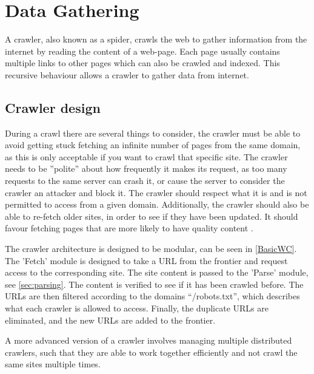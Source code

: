 \section{Data Gathering}\label{sec:DataGathering}
A crawler, also known as a spider, crawls the web to gather information from the
internet by reading the content of a web-page. Each page usually contains
multiple links to other pages which can also be crawled and indexed. This
recursive behaviour allows a crawler to gather data from internet.

\subsection{Crawler design}%
During a crawl there are several things to consider, the crawler must be able
to avoid getting stuck fetching an infinite number of pages from the same
domain, as this is only acceptable if you want to crawl that specific site. The
crawler needs to be ''polite'' about how frequently it makes its request, as
too many requests to the same server can crash it, or cause the server to
consider the crawler an attacker and block it. The crawler should respect what
it is and is not permitted to access from a given domain. Additionally, the
crawler should also be able to re-fetch older sites, in order to see if they
have been updated. It should favour fetching pages that are more likely to have
quality content \citep[Ch. 20.1]{manning2008introduction}.\nl

The crawler architecture is designed to be modular, can be seen in
\autoref{BasicWC}. The 'Fetch' module is designed to take a URL from the
frontier and request access to the corresponding site. The site content is
passed to the 'Parse' module, see \autoref{sec:parsing}.
The content is verified to see if it has been crawled before. The URLs are then
filtered according to the domains ``/robots.txt'', which describes what each
crawler is allowed to access. Finally, the duplicate URLs are eliminated, and
the new URLs are added to the frontier.


A more advanced version of a crawler involves managing multiple distributed
crawlers, such that they are able to work together efficiently and not crawl
the same sites multiple times.

